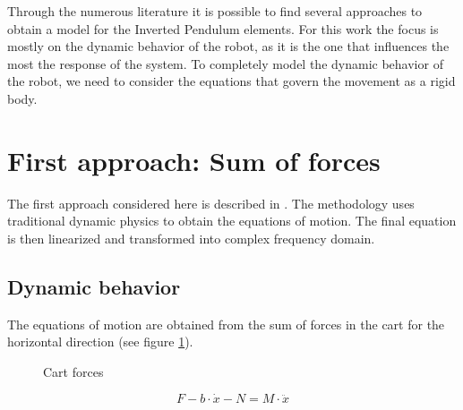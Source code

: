 
Through the numerous literature it is possible to find several approaches to obtain a model for the Inverted Pendulum elements. For this work the focus is mostly on the dynamic behavior of the robot, as it is the one that influences the most the response of the system. To completely model the dynamic behavior of the robot, we need to consider the equations that govern the movement as a rigid body.

\section{First approach: Sum of forces}

The first approach considered here is described in \cite{SUL03}. The methodology uses traditional dynamic physics to obtain the equations of motion. The final equation is then linearized and transformed into complex frequency domain.

\subsection{Dynamic behavior}

The equations of motion are obtained from the sum of forces in the cart for the horizontal direction (see figure \ref{fig:carforces}).

\begin{figure}[h]
	\centering
	\caption{Cart forces}\label{fig:carforces}
\end{figure}

\begin{equation} \label{sfch}
	F-b\cdot \dot{x}-N=M\cdot \ddot{x}
\end{equation}


